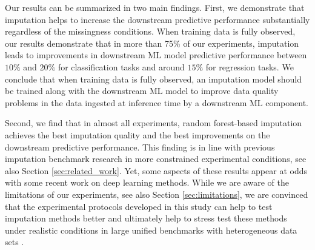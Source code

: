 \documentclass[utf8]{frontiersSCNS} %
\begin{document}
Our results can be summarized in two main findings. First, we demonstrate that imputation helps to increase the downstream predictive performance substantially regardless of the missingness conditions. When training data is fully observed, our results demonstrate that in more than 75\% of our experiments, imputation leads to improvements in downstream ML model predictive performance between $10\%$ and $20\%$ for classification tasks and around $15\%$ for regression tasks. We conclude that when training data is fully observed, an imputation model should be trained along with the downstream ML model to improve data quality problems in the data ingested at inference time by a downstream ML component.

Second, we find that in almost all experiments, random forest-based imputation achieves the best imputation quality and the best improvements on the downstream predictive performance. This finding is in line with previous imputation benchmark research in more constrained experimental conditions, see also Section \ref{sec:related_work}. Yet, some aspects of these results appear at odds with some recent work on deep learning methods. While we are aware of the limitations of our experiments, see also Section \ref{sec:limitations}, we are convinced that the experimental protocols developed in this study can help to test imputation methods better and ultimately help to stress test these methods under realistic conditions in large unified benchmarks with heterogeneous data sets \citep{Sculley2018, Bender2021}.








\end{document}
